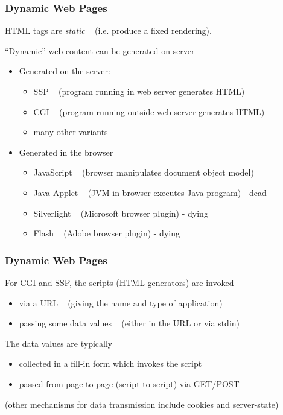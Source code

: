 \begin{frame}
\frametitle{Dynamic Web Pages}
HTML tags are {\em{static}}
    ~ {\small  (i.e. produce a fixed rendering).}

``Dynamic'' web content can be generated on server

\begin{itemize}
\item  Generated on the server:
\begin{itemize}
\item  SSP ~ {\small (program running in web server generates HTML)}
\item  CGI ~ {\small (program running outside web server generates HTML)}
\item  many other variants
\end{itemize}

\item  Generated in the browser
\begin{itemize}
\item  JavaScript ~ {\small (browser manipulates document object model)}
\item  Java Applet ~ {\small (JVM in browser executes Java program) - dead}
\item  Silverlight ~ {\small (Microsoft browser plugin) - dying}
\item  Flash ~ {\small (Adobe browser plugin) - dying}
\end{itemize}
\end{itemize}
\end{frame}

\begin{frame}
\frametitle{Dynamic Web Pages}
For CGI and SSP, the scripts {\small (HTML generators)} are invoked
\begin{itemize}
\item  via a URL
    ~ {\small (giving the name and type of application)}
\item  passing some data values
    ~ {\small (either in the URL or via stdin)}
\end{itemize}
The data values are typically
\begin{itemize}
\item  collected in a fill-in form which invokes the script
\item  passed from page to page (script to script) via GET/POST
\end{itemize}
{\small 
(other mechanisms for data transmission include cookies and server-state)
}
\end{frame}

